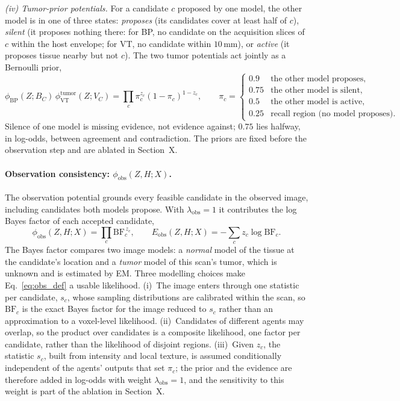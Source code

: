 \documentclass[fleqn,10pt]{olplainarticle}
\begin{document}
\textit{(iv) Tumor-prior potentials.} For a candidate $c$ proposed by one model, the other model is in one of three
states: \emph{proposes} (its candidates cover at least half of $c$), \emph{silent} (it proposes nothing there: for BP, no
candidate on the acquisition slices of $c$ within the host envelope; for VT, no candidate within $10$\,mm), or
\emph{active} (it proposes tissue nearby but not $c$). The two tumor potentials act jointly as a Bernoulli prior,
\begin{equation}
\label{eq:tumor_prior}
\phi_{\mathrm{BP}}(Z;B_C)\,\phi^{\mathrm{tumor}}_{\mathrm{VT}}(Z;V_C)=\prod_{c}\pi_c^{z_c}(1-\pi_c)^{1-z_c},
\qquad
\pi_c=\begin{cases}
0.9 & \text{the other model proposes},\\
0.75 & \text{the other model is silent},\\
0.5 & \text{the other model is active},\\
0.25 & \text{recall region (no model proposes)}.
\end{cases}
\end{equation}
Silence of one model is missing evidence, not evidence against; $0.75$ lies halfway, in log-odds, between agreement and
contradiction. The priors are fixed before the observation step and are ablated in Section~X.

\paragraph{Observation consistency: $\phi_{\mathrm{obs}}(Z,H;X)$.}
The observation potential grounds every feasible candidate in the observed image, including candidates both models
propose. With $\lambda_{\mathrm{obs}}=1$ it contributes the log Bayes factor of each accepted candidate,
\begin{equation}
\label{eq:obs_def}
\phi_{\mathrm{obs}}(Z,H;X)=\prod_{c}\mathrm{BF}_c^{\,z_c},\qquad
E_{\mathrm{obs}}(Z,H;X)=-\sum_{c} z_c\log\mathrm{BF}_c .
\end{equation}
The Bayes factor compares two image models: a \emph{normal} model of the tissue at the candidate's location and a
\emph{tumor} model of this scan's tumor, which is unknown and is estimated by EM. Three modelling choices make
Eq.~\eqref{eq:obs_def} a usable likelihood. (i)~The image enters through one statistic per candidate, $s_c$, whose
sampling distributions are calibrated within the scan, so $\mathrm{BF}_c$ is the exact Bayes factor for the image reduced to
$s_c$ rather than an approximation to a voxel-level likelihood. (ii)~Candidates of different agents may overlap, so the
product over candidates is a composite likelihood, one factor per candidate, rather than the likelihood of disjoint regions.
(iii)~Given $z_c$, the statistic $s_c$, built from intensity and local texture, is assumed conditionally independent of the
agents' outputs that set $\pi_c$; the prior and the evidence are therefore added in log-odds with weight
$\lambda_{\mathrm{obs}}=1$, and the sensitivity to this weight is part of the ablation in Section~X.
\end{document}
